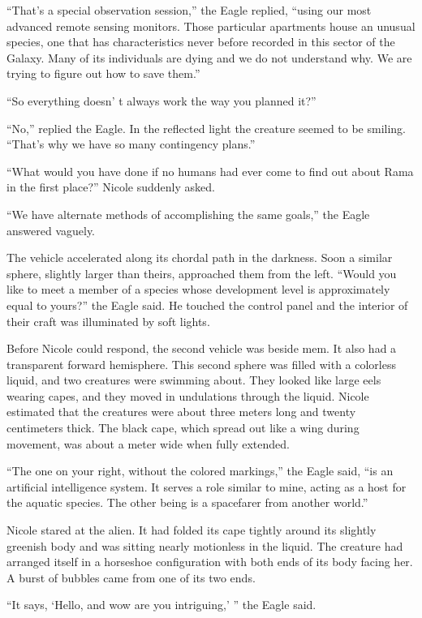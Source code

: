 \documentclass[]{article}
\begin{document}
{“That’s a special observation session,” the Eagle replied, “using our most advanced remote sensing monitors.  Those particular apartments house an unusual species, one that has characteristics never before recorded in this sector of the Galaxy.  Many of its individuals are dying and we do not understand why.  We are trying to figure out how to save them.”

“So everything doesn’ t always work the way you planned it?”

“No,” replied the Eagle.  In the reflected light the creature seemed to be smiling.  “That’s why we have so many contingency plans.”

“What would you have done if no humans had ever come to find out about Rama in the first place?” Nicole suddenly asked.

“We have alternate methods of accomplishing the same goals,” the Eagle answered vaguely.

The vehicle accelerated along its chordal path in the darkness.  Soon a similar sphere, slightly larger than theirs, approached them from the left.  “Would you like to meet a member of a species whose development level is approximately equal to yours?” the Eagle said.  He touched the control panel and the interior of their craft was illuminated by soft lights.

Before Nicole could respond, the second vehicle was beside mem.  It also had a transparent forward hemisphere.  This second sphere was filled with a colorless liquid, and two creatures were swimming about.  They looked like large eels wearing capes, and they moved in undulations through the liquid.  Nicole estimated that the creatures were about three meters long and twenty centimeters thick.  The black cape, which spread out like a wing during movement, was about a meter wide when fully extended.

“The one on your right, without the colored markings,” the Eagle said, “is an artificial intelligence system.  It serves a role similar to mine, acting as a host for the aquatic species.  The other being is a spacefarer from another world.”

Nicole stared at the alien.  It had folded its cape tightly around its slightly greenish body and was sitting nearly motionless in the liquid.  The creature had arranged itself in a horseshoe configuration with both ends of its body facing her.  A burst of bubbles came from one of its two ends.

“It says, ‘Hello, and wow are you intriguing,’ ” the Eagle said.

}
\end{document}
